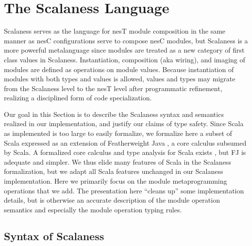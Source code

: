 \section{The Scalaness Language}
\label{section-scalaness}

Scalaness serves as the language for nesT module composition in the
same manner as nesC configurations serve to compose nesC modules, but
Scalaness is a more powerful metalanguage since modules are treated as
a new category of first class values in Scalaness.  Instantiation,
composition (aka wiring), and imaging of modules are defined as
operations on module values.  Because instantiation of modules with
both types and values is allowed, values and types may migrate from
the Scalaness level to the nesT level after programmatic refinement,
realizing a disciplined form of code specialization.

Our goal in this Section is to describe the
Scalaness syntax and semantics realized in our implementation, and
justify our claims of type safety. Since Scala as implemented is too
large to easily formalize, we formalize here a subset of Scala
expressed as an extension of Featherweight Java \cite{FJ}, a core
calculus subsumed by Scala. A formalized core calculus and type
analysis for Scala exists \cite{Cremet:2006:CCS:2135978.2135980}, but
FJ is adequate and simpler.  We thus elide many features of Scala in
the Scalaness formalization, but we adapt all Scala features unchanged
in our Scalaness implementation.  Here we primarily focus on the
module metaprogramming operations that we add.  The presentation here
``cleans up'' some implementation details, but is otherwise an
accurate description of the module operation semantics and especially
the module operation typing rules.


\subsection{Syntax of Scalaness}


